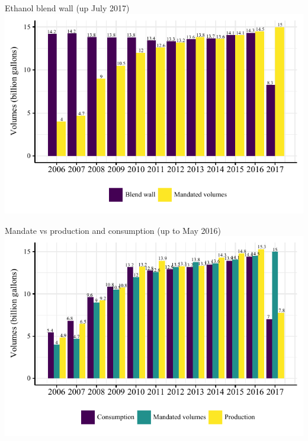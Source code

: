 \documentclass[table,xcolor=pdftex,dvipsnames]{beamer}\usepackage[]{graphicx}\usepackage[]{color}
\makeatletter
\def\maxwidth{ %
  \ifdim\Gin@nat@width>\linewidth
    \linewidth
  \else
    \Gin@nat@width
  \fi
}
\newenvironment{knitrout}{}{} %
\makeatother
\begin{document}
\begin{frame}{Ethanol blend wall (up July 2017)}
\begin{knitrout}
\color{fgcolor}
\includegraphics[width=\maxwidth]{figure/figure_wall-1} 

\end{knitrout}
\end{frame}


\begin{frame}{Mandate vs production and consumption (up to May 2016)}
\begin{knitrout}
\color{fgcolor}
\includegraphics[width=\maxwidth]{figure/figure_rfs-1} 

\end{knitrout}
\scriptsize
\end{frame}
\end{document}
